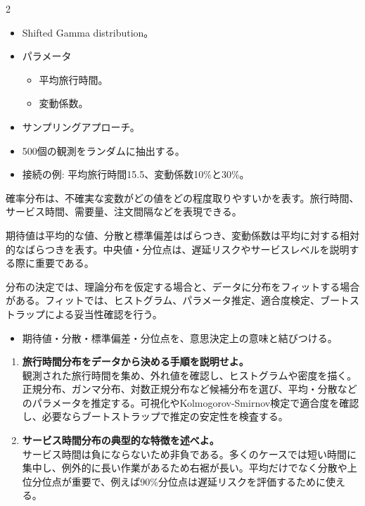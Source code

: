 \clearpage
{}
\begin{multicols}{2}\footnotesize\raggedcolumns
{}
\begin{itemize}
\item Shifted Gamma distribution。
\item パラメータ
\begin{itemize}
\item 平均旅行時間。
\item 変動係数。
\end{itemize}
\item サンプリングアプローチ。
\item 500個の観測をランダムに抽出する。
\item 接続の例: 平均旅行時間15.5、変動係数10\%と30\%。
\end{itemize}
確率分布は、不確実な変数がどの値をどの程度取りやすいかを表す。旅行時間、サービス時間、需要量、注文間隔などを表現できる。\par

期待値は平均的な値、分散と標準偏差はばらつき、変動係数は平均に対する相対的なばらつきを表す。中央値・分位点は、遅延リスクやサービスレベルを説明する際に重要である。\par

分布の決定では、理論分布を仮定する場合と、データに分布をフィットする場合がある。フィットでは、ヒストグラム、パラメータ推定、適合度検定、ブートストラップによる妥当性確認を行う。\par
{}
\begin{itemize}
\item 期待値・分散・標準偏差・分位点を、意思決定上の意味と結びつける。
\end{itemize}
\begin{enumerate}
\item \textbf{旅行時間分布をデータから決める手順を説明せよ。}\\観測された旅行時間を集め、外れ値を確認し、ヒストグラムや密度を描く。正規分布、ガンマ分布、対数正規分布など候補分布を選び、平均・分散などのパラメータを推定する。可視化やKolmogorov-Smirnov検定で適合度を確認し、必要ならブートストラップで推定の安定性を検査する。
\item \textbf{サービス時間分布の典型的な特徴を述べよ。}\\サービス時間は負にならないため非負である。多くのケースでは短い時間に集中し、例外的に長い作業があるため右裾が長い。平均だけでなく分散や上位分位点が重要で、例えば90\%分位点は遅延リスクを評価するために使える。
\end{enumerate}
\end{multicols}

